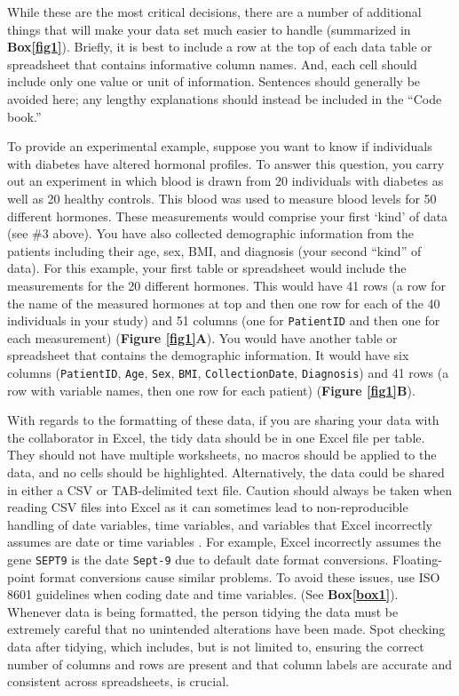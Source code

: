 \documentclass[12pt]{article}
\begin{document}
While these are the most critical decisions, there are a number of
additional things that will make your data set much easier to handle
\citep{woo_browman} (summarized in \textbf{Box\ref{fig1}}). Briefly, it
is best to include a row at the top of each data table or spreadsheet
that contains informative column names. And, each cell should include
only one value or unit of information. Sentences should generally be
avoided here; any lengthy explanations should instead be included in the
``Code book.''

To provide an experimental example, suppose you want to know if
individuals with diabetes have altered hormonal profiles. To answer this
question, you carry out an experiment in which blood is drawn from 20
individuals with diabetes as well as 20 healthy controls. This blood was
used to measure blood levels for 50 different hormones. These
measurements would comprise your first `kind' of data (see \#3 above).
You have also collected demographic information from the patients
including their age, sex, BMI, and diagnosis (your second ``kind'' of
data). For this example, your first table or spreadsheet would include
the measurements for the 20 different hormones. This would have 41 rows
(a row for the name of the measured hormones at top and then one row for
each of the 40 individuals in your study) and 51 columns (one for
\texttt{PatientID} and then one for each measurement) (\textbf{Figure
\ref{fig1}A}). You would have another table or spreadsheet that contains
the demographic information. It would have six columns
(\texttt{PatientID}, \texttt{Age}, \texttt{Sex}, \texttt{BMI},
\texttt{CollectionDate}, \texttt{Diagnosis}) and 41 rows (a row with
variable names, then one row for each patient) (\textbf{Figure
\ref{fig1}B}).

With regards to the formatting of these data, if you are sharing your
data with the collaborator in Excel, the tidy data should be in one
Excel file per table. They should not have multiple worksheets, no
macros should be applied to the data, and no cells should be
highlighted. Alternatively, the data could be shared in either a CSV or
TAB-delimited text file. Caution should always be taken when reading CSV
files into Excel as it can sometimes lead to non-reproducible handling
of date variables, time variables, and variables that Excel incorrectly
assumes are date or time variables \citep{zeeberg_mistaken_2004}. For
example, Excel incorrectly assumes the gene \texttt{SEPT9} is the date
\texttt{Sept-9} due to default date format conversions. Floating-point
format conversions cause similar problems. To avoid these issues, use
ISO 8601 \citep{newman_date_nodate} guidelines when coding date and time
variables. (See \textbf{Box\ref{box1}}). Whenever data is being
formatted, the person tidying the data must be extremely careful that no
unintended alterations have been made. Spot checking data after tidying,
which includes, but is not limited to, ensuring the correct number of
columns and rows are present and that column labels are accurate and
consistent across spreadsheets, is crucial.
\end{document}
